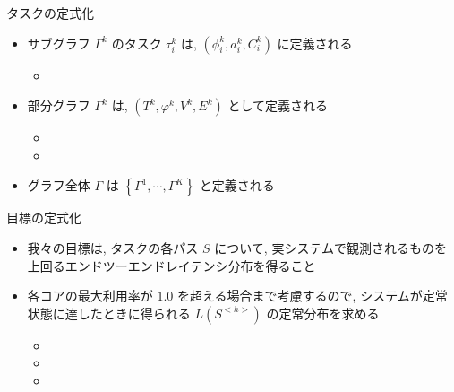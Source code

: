 \begin{frame}{タスクの定式化}
    \begin{itemize}
        \item サブグラフ $\Gamma^{k}$ のタスク $\tau_{i}^{k}$ は, $\left(\phi_{i}^{k}, a_{i}^{k}, C_{i}^{k}\right)$ に定義される
        \begin{itemize}
            \item {}
        \end{itemize}
        \item 部分グラフ $\Gamma^{k}$ は, $\left(T^{k}, \varphi^{k}, V^{k}, E^{k}\right)$ として定義される
        \begin{itemize}
            \item {}
            \item {}
        \end{itemize}
        \item グラフ全体 $\Gamma$ は $\left\{\Gamma^{1}, \cdots, \Gamma^{K}\right\}$ と定義される
    \end{itemize}
\end{frame}

\begin{frame}{目標の定式化}
    \begin{itemize}
        \item 我々の目標は, タスクの各パス $S$ について, 実システムで観測されるものを上回るエンドツーエンドレイテンシ分布を得ること
        \item 各コアの最大利用率が $1.0$ を超える場合まで考慮するので, システムが定常状態に達したときに得られる $L\left(S^{<h>}\right)$ の定常分布を求める
        \begin{itemize}
            \item {}
            \item {}
            \item {}
        \end{itemize}
    \end{itemize}
\end{frame}
